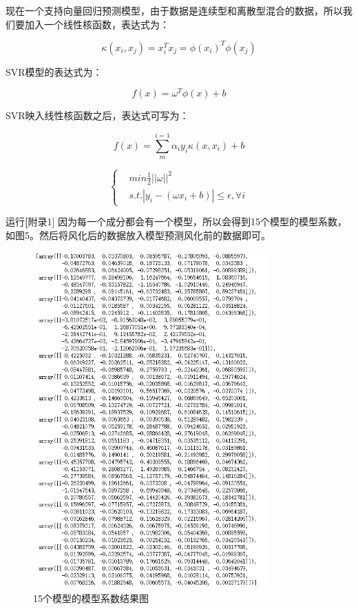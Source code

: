 \documentclass[withoutpreface,bwprint]{cumcmthesis}%
\begin{document}
	现在一个支持向量回归预测模型，由于数据是连续型和离散型混合的数据，所以我们要加入一个线性核函数，表达式为：
	
	\begin{equation}
		\kappa \left(x_{i},x_{j}\right) = x_{i}^{T} x_{j}=\phi\left(x_{i}\right)^T\phi\left(x_{j}\right)
	\end{equation}
	
	SVR模型的表达式为：
	
	\begin{equation}
		f\left(x\right) = \omega^{T}\phi\left(x\right) + b 
	\end{equation}
	
	SVR映入线性核函数之后，表达式可写为：
	 
	\begin{equation}
	    f\left(x\right) = \sum_{m}^{i=1} \alpha_{i}y_{i} \kappa \left(x,x_{i}\right)+ b 
	\end{equation}
	
	
	\begin{equation}
		\left\{  
		\begin{aligned}  
			&min \frac{1}{2}||\omega||^{2} \\  
			&s.t.|y_{i} - (\omega x_{i}+b)| \leq \epsilon,\forall i
		\end{aligned}  
		\right. 
	\end{equation}
	
	运行\textbf[附录1] 因为每一个成分都会有一个模型，所以会得到15个模型的模型系数，如图5。然后将风化后的数据放入模型预测风化前的数据即可。
	
	\begin{figure}[!h]
		\centering
		\includegraphics[width=0.8\textwidth]{ph5}
		\caption{15个模型的模型系数结果图}
		\label{fig:ph5}
	\end{figure}
	
\end{document}
